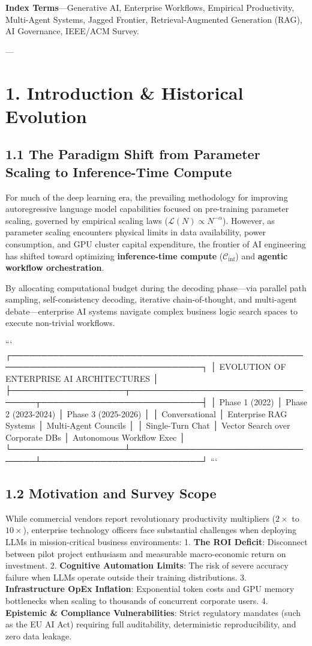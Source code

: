 \documentclass[10pt,journal,compsoc,twocolumn]{IEEEtran}
\begin{document}
\textbf{Index Terms}—Generative AI, Enterprise Workflows, Empirical Productivity, Multi-Agent Systems, Jagged Frontier, Retrieval-Augmented Generation (RAG), AI Governance, IEEE/ACM Survey.

---

\section{1. Introduction & Historical Evolution}

\subsection{1.1 The Paradigm Shift from Parameter Scaling to Inference-Time Compute}
For much of the deep learning era, the prevailing methodology for improving autoregressive language model capabilities focused on pre-training parameter scaling, governed by empirical scaling laws ($\mathcal{L}(N) \propto N^{-\alpha}$). However, as parameter scaling encounters physical limits in data availability, power consumption, and GPU cluster capital expenditure, the frontier of AI engineering has shifted toward optimizing \textbf{inference-time compute} ($\mathcal{C}_{\text{inf}}$) and \textbf{agentic workflow orchestration}.

By allocating computational budget during the decoding phase—via parallel path sampling, self-consistency decoding, iterative chain-of-thought, and multi-agent debate—enterprise AI systems navigate complex business logic search spaces to execute non-trivial workflows.

```
  ┌──────────────────────────────────────────────────────────────────────────────────┐
  │                 EVOLUTION OF ENTERPRISE AI ARCHITECTURES                         │
  ├───────────────────┬──────────────────────────────────┬───────────────────────────┤
  │ Phase 1 (2022)    │ Phase 2 (2023-2024)              │ Phase 3 (2025-2026)       │
  │ Conversational    │ Enterprise RAG Systems           │ Multi-Agent Councils      │
  │ Single-Turn Chat  │ Vector Search over Corporate DBs │ Autonomous Workflow Exec  │
  └───────────────────┴──────────────────────────────────┴───────────────────────────┘
```

\subsection{1.2 Motivation and Survey Scope}
While commercial vendors report revolutionary productivity multipliers ($2\times$ to $10\times$), enterprise technology officers face substantial challenges when deploying LLMs in mission-critical business environments:
1. \textbf{The ROI Deficit}: Disconnect between pilot project enthusiasm and measurable macro-economic return on investment.
2. \textbf{Cognitive Automation Limits}: The risk of severe accuracy failure when LLMs operate outside their training distributions.
3. \textbf{Infrastructure OpEx Inflation}: Exponential token costs and GPU memory bottlenecks when scaling to thousands of concurrent corporate users.
4. \textbf{Epistemic & Compliance Vulnerabilities}: Strict regulatory mandates (such as the EU AI Act) requiring full auditability, deterministic reproducibility, and zero data leakage.
\end{document}
